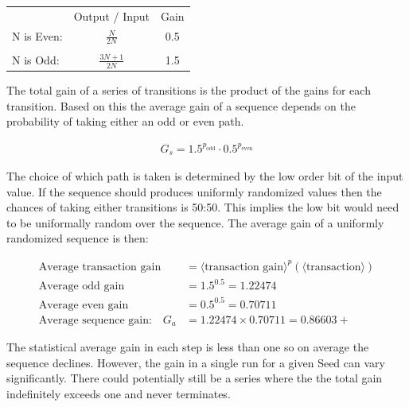 \documentclass[letterpaper]{article}
\begin{document}
\begin{center}
\begin{tabular}{l c c}
  & Output / Input & Gain \\
 N is Even: &  $\frac{N}{2N}$  & 0.5 \\  
&&\\
 N is Odd: & $\frac{3N + 1}{2N}$ & 1.5
\end{tabular}
\end{center}

The total gain of a series of transitions is the product of the gains for each transition. Based on this the average gain of a sequence depends on the probability of taking either an odd or even path.

\begin{align*}
    G_s = 1.5^{p_{\text{odd}}} \cdot 0.5^{p_{\text{even}}}
\end{align*}

The choice of which path is taken is determined by the low order bit of the input value. If the sequence should produces uniformly randomized values then the chances of taking either transitions is 50:50. This implies the low bit would need to be uniformally random over the sequence. The average gain of a uniformly randomized sequence is then:

\begin{align*}
    \text{Average transaction gain} &= \langle \text{transaction gain} \rangle^p(\langle \text{transaction} \rangle) \\
    \text{Average odd gain} &= 1.5^{0.5} = 1.22474 \\
    \text{Average even gain} &= 0.5^{0.5} = 0.70711 \\
    \text{Average sequence gain:} \quad G_a &= 1.22474 \times 0.70711 = 0.86603+
\end{align*}

The statistical average gain in each step is less than one so on average the sequence declines. However, the gain in a single run for a given Seed can vary significantly. There could potentially still be a series where the the total gain indefinitely exceeds one and never terminates.
\end{document}
